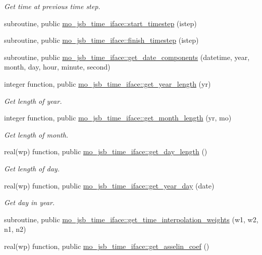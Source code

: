 \begin{DoxyCompactItemize}
\begin{DoxyCompactList}\small\item\em Get time at previous time step. \end{DoxyCompactList}\item 
subroutine, public \hyperlink{namespacemo__jsb__time__iface_a01e05b9838b013ea37b6bd5f9e446ce6}{mo\+\_\+jsb\+\_\+time\+\_\+iface\+::start\+\_\+timestep} (istep)
\item 
subroutine, public \hyperlink{namespacemo__jsb__time__iface_a6f035dd414c8b19cde3a73e39f6afa3a}{mo\+\_\+jsb\+\_\+time\+\_\+iface\+::finish\+\_\+timestep} (istep)
\item 
subroutine, public \hyperlink{namespacemo__jsb__time__iface_aefc6d88ce2a25c59f0931865095f217b}{mo\+\_\+jsb\+\_\+time\+\_\+iface\+::get\+\_\+date\+\_\+components} (datetime, year, month, day, hour, minute, second)
\item 
integer function, public \hyperlink{namespacemo__jsb__time__iface_a4e7bdc2a98bd137115b6b270439065b0}{mo\+\_\+jsb\+\_\+time\+\_\+iface\+::get\+\_\+year\+\_\+length} (yr)
\begin{DoxyCompactList}\small\item\em Get length of year. \end{DoxyCompactList}\item 
integer function, public \hyperlink{namespacemo__jsb__time__iface_a443c83592d475f0832e0147783a960ba}{mo\+\_\+jsb\+\_\+time\+\_\+iface\+::get\+\_\+month\+\_\+length} (yr, mo)
\begin{DoxyCompactList}\small\item\em Get length of month. \end{DoxyCompactList}\item 
real(wp) function, public \hyperlink{namespacemo__jsb__time__iface_a53e5fa510aa754954b65b557be123be4}{mo\+\_\+jsb\+\_\+time\+\_\+iface\+::get\+\_\+day\+\_\+length} ()
\begin{DoxyCompactList}\small\item\em Get length of day. \end{DoxyCompactList}\item 
real(wp) function, public \hyperlink{namespacemo__jsb__time__iface_a9b807c3d9aa14da6ed98308332014a52}{mo\+\_\+jsb\+\_\+time\+\_\+iface\+::get\+\_\+year\+\_\+day} (date)
\begin{DoxyCompactList}\small\item\em Get day in year. \end{DoxyCompactList}\item 
subroutine, public \hyperlink{namespacemo__jsb__time__iface_a4de628dda235839b578e82755b9b98ab}{mo\+\_\+jsb\+\_\+time\+\_\+iface\+::get\+\_\+time\+\_\+interpolation\+\_\+weights} (w1, w2, n1, n2)
\item 
real(wp) function, public \hyperlink{namespacemo__jsb__time__iface_ac63a5305338faddee24202e1798bcf93}{mo\+\_\+jsb\+\_\+time\+\_\+iface\+::get\+\_\+asselin\+\_\+coef} ()
\end{DoxyCompactItemize}
